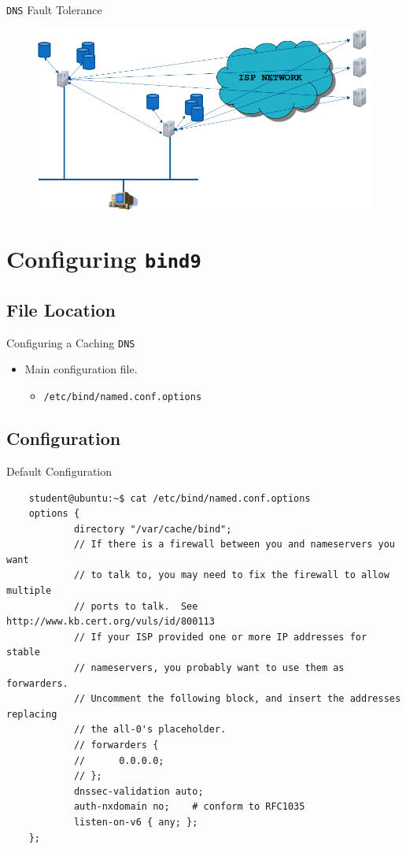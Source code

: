 \documentclass[aspectratio=169]{beamer}
\begin{document}
\begin{frame}{\texttt{DNS} Fault Tolerance}
  \begin{figure}
    \begin{center}
      \includegraphics[width=.8\linewidth]{faulttolerance.png}
    \end{center}
  \end{figure}
\end{frame}

\section{Configuring \texttt{bind9}}
\subsection{File Location}
\begin{frame}{Configuring a Caching \texttt{DNS}}
  \begin{itemize}
    \item Main configuration file.
      \begin{itemize}
        \item \texttt{/etc/bind/named.conf.options}
      \end{itemize}
  \end{itemize}
\end{frame}

\subsection{Configuration}
\begin{frame}[fragile]{Default Configuration}
  \begin{lstlisting}
    student@ubuntu:~$ cat /etc/bind/named.conf.options
    options {
            directory "/var/cache/bind";    
            // If there is a firewall between you and nameservers you want
            // to talk to, you may need to fix the firewall to allow multiple
            // ports to talk.  See http://www.kb.cert.org/vuls/id/800113
            // If your ISP provided one or more IP addresses for stable
            // nameservers, you probably want to use them as forwarders.
            // Uncomment the following block, and insert the addresses replacing
            // the all-0's placeholder.
            // forwarders {
            //      0.0.0.0;
            // };
            dnssec-validation auto;
            auth-nxdomain no;    # conform to RFC1035
            listen-on-v6 { any; };
    };
  \end{lstlisting}
\end{frame}
\end{document}
